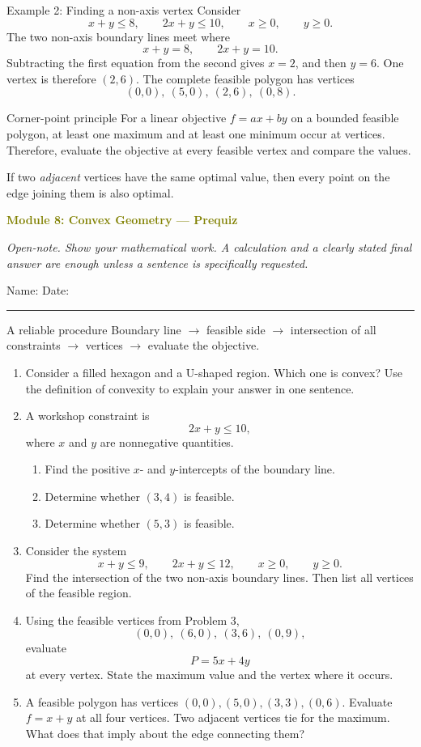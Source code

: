 \documentclass[11pt]{article}
\newcommand{\prequizhead}[2]{%
  \clearpage
  {\Large\bfseries\textcolor{olive}{Module #1: #2 — Prequiz}}\par
  \textit{Open-note. Show your mathematical work. A calculation and a clearly stated final answer are enough unless a sentence is specifically requested.}\par
  Name: \hspace{2.6in} Date: \hspace{1.1in}\par
  \vspace{2pt}\textcolor{gold}{\rule{\linewidth}{1.2pt}}\par\smallskip
}
\newcommand{\workmed}{\par\vspace{0.62in}}
\newcommand{\worklarge}{\par\vspace{0.92in}}
\newcommand{\workxl}{\par\vspace{1.22in}}
\begin{document}
\begin{examplebox}{Example 2: Finding a non-axis vertex}
Consider
\[
x+y\le8,
\qquad
2x+y\le10,
\qquad x\ge0,
\qquad y\ge0.
\]
The two non-axis boundary lines meet where
\[
x+y=8,
\qquad 2x+y=10.
\]
Subtracting the first equation from the second gives \(x=2\), and then \(y=6\). One vertex is therefore \((2,6)\). The complete feasible polygon has vertices
\[
(0,0),\ (5,0),\ (2,6),\ (0,8).
\]
\end{examplebox}

\begin{keybox}{Corner-point principle}
For a linear objective \(f=ax+by\) on a bounded feasible polygon, at least one maximum and at least one minimum occur at vertices. Therefore, evaluate the objective at every feasible vertex and compare the values.

If two \emph{adjacent} vertices have the same optimal value, then every point on the edge joining them is also optimal.
\end{keybox}

\prequizhead{8}{Convex Geometry}
\begin{refbox}{A reliable procedure}
Boundary line \(\to\) feasible side \(\to\) intersection of all constraints \(\to\) vertices \(\to\) evaluate the objective.
\end{refbox}

\begin{enumerate}
\item Consider a filled hexagon and a U-shaped region. Which one is convex? Use the definition of convexity to explain your answer in one sentence.
\workmed

\item A workshop constraint is
\[
2x+y\le10,
\]
where \(x\) and \(y\) are nonnegative quantities.
\begin{enumerate}[label=(\alph*),itemsep=4pt]
\item Find the positive \(x\)- and \(y\)-intercepts of the boundary line.
\item Determine whether \((3,4)\) is feasible.
\item Determine whether \((5,3)\) is feasible.
\end{enumerate}
\worklarge

\item Consider the system
\[
x+y\le9,
\qquad
2x+y\le12,
\qquad x\ge0,
\qquad y\ge0.
\]
Find the intersection of the two non-axis boundary lines. Then list all vertices of the feasible region.
\workxl

\item Using the feasible vertices from Problem 3,
\[
(0,0),\ (6,0),\ (3,6),\ (0,9),
\]
evaluate
\[
P=5x+4y
\]
at every vertex. State the maximum value and the vertex where it occurs.
\worklarge

\item A feasible polygon has vertices \((0,0),(5,0),(3,3),(0,6)\). Evaluate \(f=x+y\) at all four vertices. Two adjacent vertices tie for the maximum. What does that imply about the edge connecting them?
\worklarge
\end{enumerate}
\end{document}
